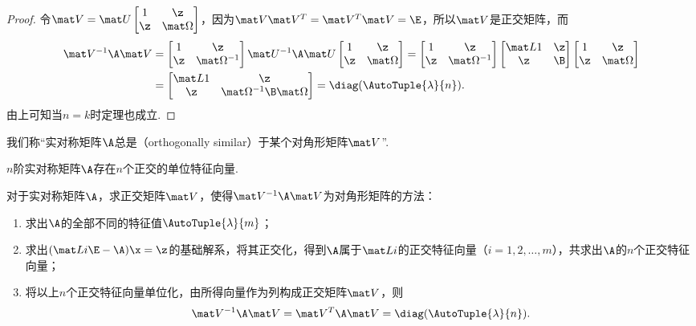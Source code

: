 \begin{theorem}
\begin{proof}
令\(\Q=\P\begin{bmatrix} 1 & \z \\ \z & \M \end{bmatrix}\)，因为\(\Q\Q^T=\Q^T\Q=\E\)，所以\(\Q\)是正交矩阵，而\begin{align*}
\Q^{-1}\A\Q
&=\begin{bmatrix}
1 & \z \\
\z & \M^{-1}
\end{bmatrix}\P^{-1}\A\P\begin{bmatrix}
1 & \z \\
\z & \M
\end{bmatrix}=\begin{bmatrix}
1 & \z \\
\z & \M^{-1}
\end{bmatrix}\begin{bmatrix}
\L1 & \z \\
\z & \B
\end{bmatrix}\begin{bmatrix}
1 & \z \\
\z & \M
\end{bmatrix} \\
&=\begin{bmatrix}
\L1 & \z \\
\z & \M^{-1}\B\M
\end{bmatrix}
=\diag(\AutoTuple{\lambda}{n}).
\end{align*}
由上可知当\(n=k\)时定理也成立.
\end{proof}
\rm
我们称“实对称矩阵\(\A\)总是（{orthogonally similar}）于某个对角形矩阵\(\V\)”.
\end{theorem}

\begin{corollary}
\(n\)阶实对称矩阵\(\A\)存在\(n\)个正交的单位特征向量.
\end{corollary}

\begingroup
\color{red}
对于实对称矩阵\(\A\)，求正交矩阵\(\Q\)，使得\(\Q^{-1}\A\Q\)为对角形矩阵的方法：
\begin{enumerate}
\item 求出\(\A\)的全部不同的特征值\(\AutoTuple{\lambda}{m}\)；
\item 求出\((\L{i}\E-\A)\x=\z\)的基础解系，将其正交化，得到\(\A\)属于\(\L{i}\)的正交特征向量（\(i=1,2,\dotsc,m\)），共求出\(\A\)的\(n\)个正交特征向量；
\item 将以上\(n\)个正交特征向量单位化，由所得向量作为列构成正交矩阵\(\Q\)，则\[
\Q^{-1}\A\Q = \Q^T \A \Q = \diag(\AutoTuple{\lambda}{n}).
\]
\end{enumerate}
\endgroup

